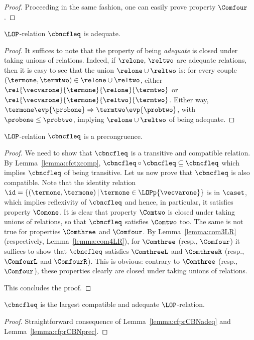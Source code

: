 \begin{proof}
  Proceeding in the same fashion, one can easily prove property $\Comfour$.
\end{proof}

\begin{lemma}\label{lemma:cfprCBNadeq}
  $\LOP$-relation $\cbncfleq$ is adequate.
\end{lemma}
\begin{proof}
It suffices to note that the property of being \textit{adequate} is
  closed under taking unions of relations. Indeed, if $\relone,\,\reltwo$
  are adequate relations, then it is easy to see that the union
  $\relone\cup\reltwo$ is: for every couple
  $(\termone,\termtwo)\in\relone\cup\reltwo$, either
  $\rel{\vecvarone}{\termone}{\relone}{\termtwo}$ or
  $\rel{\vecvarone}{\termone}{\reltwo}{\termtwo}$. Either way,
  $\termone\evp{\probone}\Rightarrow \termtwo\evp{\probtwo}$, with
  $\probone\leq\probtwo$, implying $\relone\cup\reltwo$ of being adequate.
\end{proof}

\begin{lemma}\label{lemma:cfprCBNprec}
  $\LOP$-relation $\cbncfleq$ is a precongruence.
\end{lemma}
\begin{proof}
  We need to show that $\cbncfleq$ is a transitive and compatible
  relation. By Lemma~\ref{lemma:cfctxcomp},
  $\cbncfleq\circ\cbncfleq\subseteq\cbncfleq$ which implies $\cbncfleq$ of
  being transitive. Let us now prove that $\cbncfleq$ is also compatible.
  Note that the identity relation $\id =
  \{(\termone,\termone)\,|\,\termone\in\LOPp{\vecvarone}\}$ is in $\caset$,
  which implies reflexivity of $\cbncfleq$ and hence, in particular, it
  satisfies property $\Comone$.  It is clear that property $\Comtwo$ is
  closed under taking unions of relations, so that $\cbncfleq$ satisfies
  $\Comtwo$ too. The same is not true for properties $\Comthree$ and
  $\Comfour$. By Lemma~\ref{lemma:com3LR} (respectively,
  Lemma~\ref{lemma:com4LR}), for $\Comthree$ (resp., $\Comfour$) it
  suffices to show that $\cbncfleq$ satisfies $\ComthreeL$ and $\ComthreeR$
  (resp., $\ComfourL$ and $\ComfourR$). This is obvious: contrary to
  $\Comthree$ (resp., $\Comfour$), these properties clearly are closed
  under taking unions of relations.

  This concludes the proof.
\end{proof}

\begin{corollary}
  $\cbncfleq$ is the largest compatible and adequate $\LOP$-relation.
\end{corollary}
\begin{proof}
  Straightforward consequence of Lemma~\ref{lemma:cfprCBNadeq} and
  Lemma~\ref{lemma:cfprCBNprec}.
\end{proof}

